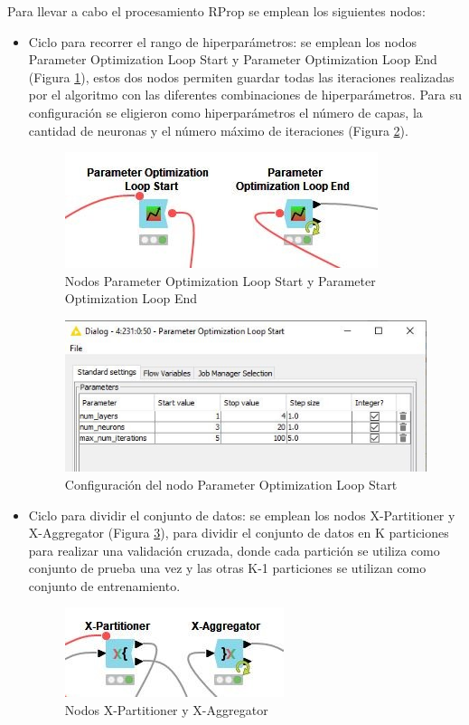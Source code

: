 Para llevar a cabo el procesamiento RProp se emplean los siguientes nodos: 
\begin{itemize}
	\item Ciclo para recorrer el rango de hiperparámetros: se emplean los nodos Parameter Optimization Loop Start y Parameter Optimization Loop End (Figura \ref{fig:nodos-param-opt-loop}), estos dos nodos permiten guardar todas las iteraciones realizadas por el algoritmo con las diferentes combinaciones de hiperparámetros. Para su configuración se eligieron como hiperparámetros el número de capas, la cantidad de neuronas y el número máximo de iteraciones (Figura \ref{fig:conf-nodo-param-loop}).
	\begin{figure}[H]
		\centering
		\includegraphics[width=0.5\linewidth]{"figuras/capi 2/nodos-param-opt-loop"}
		\caption[Nodos Parameter Optimization Loop Start y Parameter Optimization Loop End]{Nodos Parameter Optimization Loop Start y Parameter Optimization Loop End}
		\label{fig:nodos-param-opt-loop}
	\end{figure}

	\begin{figure}[H]
		\centering
		\includegraphics[width=0.6\linewidth]{"figuras/capi 2/conf-nodo-param-loop"}
		\caption[Configuración del nodo Parameter Optimization Loop Start]{Configuración del nodo Parameter Optimization Loop Start}
		\label{fig:conf-nodo-param-loop}
	\end{figure}
	
	\item Ciclo para dividir el conjunto de datos: se emplean los nodos X-Partitioner y X-Aggregator (Figura \ref{fig:nodos-cross-val}), para dividir el conjunto de datos en K particiones para realizar una validación cruzada, donde cada partición se utiliza como conjunto de prueba una vez y las otras K-1 particiones se utilizan como conjunto de entrenamiento.
	\begin{figure}[H]
		\centering
		\includegraphics[width=0.4\linewidth]{"figuras/capi 2/nodos-cross-val"}
		\caption[Nodos X-Partitioner y X-Aggregator]{Nodos X-Partitioner y X-Aggregator}
		\label{fig:nodos-cross-val}
	\end{figure}


\end{itemize}
